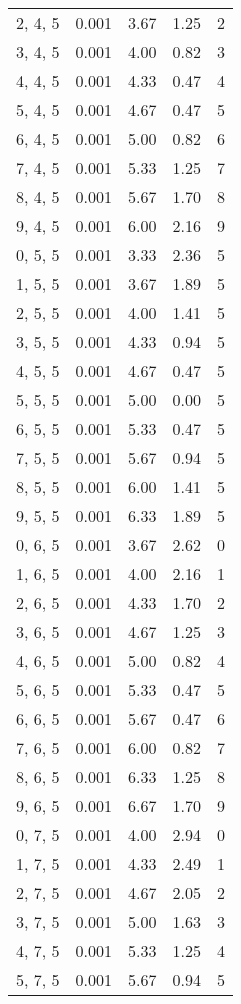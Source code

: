 \documentclass[12pt]{article}
\begin{document}
\begin{tabular}{c || c || c | c | c}
2, 4, 5 & 0.001 & 3.67 & 1.25 & 2 \\
3, 4, 5 & 0.001 & 4.00 & 0.82 & 3 \\
4, 4, 5 & 0.001 & 4.33 & 0.47 & 4 \\
5, 4, 5 & 0.001 & 4.67 & 0.47 & 5 \\
6, 4, 5 & 0.001 & 5.00 & 0.82 & 6 \\
7, 4, 5 & 0.001 & 5.33 & 1.25 & 7 \\
8, 4, 5 & 0.001 & 5.67 & 1.70 & 8 \\
9, 4, 5 & 0.001 & 6.00 & 2.16 & 9 \\
0, 5, 5 & 0.001 & 3.33 & 2.36 & 5 \\
1, 5, 5 & 0.001 & 3.67 & 1.89 & 5 \\
2, 5, 5 & 0.001 & 4.00 & 1.41 & 5 \\
3, 5, 5 & 0.001 & 4.33 & 0.94 & 5 \\
4, 5, 5 & 0.001 & 4.67 & 0.47 & 5 \\
5, 5, 5 & 0.001 & 5.00 & 0.00 & 5 \\
6, 5, 5 & 0.001 & 5.33 & 0.47 & 5 \\
7, 5, 5 & 0.001 & 5.67 & 0.94 & 5 \\
8, 5, 5 & 0.001 & 6.00 & 1.41 & 5 \\
9, 5, 5 & 0.001 & 6.33 & 1.89 & 5 \\
0, 6, 5 & 0.001 & 3.67 & 2.62 & 0 \\
1, 6, 5 & 0.001 & 4.00 & 2.16 & 1 \\
2, 6, 5 & 0.001 & 4.33 & 1.70 & 2 \\
3, 6, 5 & 0.001 & 4.67 & 1.25 & 3 \\
4, 6, 5 & 0.001 & 5.00 & 0.82 & 4 \\
5, 6, 5 & 0.001 & 5.33 & 0.47 & 5 \\
6, 6, 5 & 0.001 & 5.67 & 0.47 & 6 \\
7, 6, 5 & 0.001 & 6.00 & 0.82 & 7 \\
8, 6, 5 & 0.001 & 6.33 & 1.25 & 8 \\
9, 6, 5 & 0.001 & 6.67 & 1.70 & 9 \\
0, 7, 5 & 0.001 & 4.00 & 2.94 & 0 \\
1, 7, 5 & 0.001 & 4.33 & 2.49 & 1 \\
2, 7, 5 & 0.001 & 4.67 & 2.05 & 2 \\
3, 7, 5 & 0.001 & 5.00 & 1.63 & 3 \\
4, 7, 5 & 0.001 & 5.33 & 1.25 & 4 \\
5, 7, 5 & 0.001 & 5.67 & 0.94 & 5 \\

\end{tabular}
\end{document}
